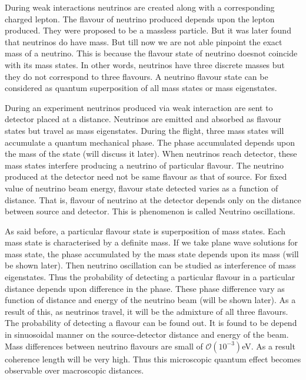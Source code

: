 \documentclass[12pt,a4paper]{report}
\begin{document}
During weak interactions neutrinos are created along with a corresponding charged lepton. The flavour of neutrino produced depends upon the lepton produced. They were proposed to be a massless particle.  But it was later found that neutrinos do have mass. But till now we are not able pinpoint the exact mass of a neutrino. This is because the flavour state of neutrino doesnot coincide with its mass states. In other words, neutrinos have three discrete masses but they do not correspond to three flavours. A neutrino flavour state can be considered as quantum superposition of all mass states or mass eigenstates. \par

During an experiment neutrinos produced via weak interaction are sent to detector placed at a distance. Neutrinos are emitted and absorbed as flavour states but travel as mass eigenstates. During the flight, three mass states will accumulate a quantum mechanical phase. The phase accumulated depends upon the mass of the state (will discuss it later). When neutrinos reach detector, these mass states interfere producing a neutrino of particular flavour. The neutrino produced at the detector need not be same flavour as that of source. For fixed value of neutrino beam energy, flavour state detected varies as a function of distance. That is, flavour of neutrino at the detector depends only on the distance between source and detector. This is phenomenon is called Neutrino oscillations.\par
As said before, a particular flavour state is superposition of mass states. Each mass state is characterised by a definite mass. If we take plane wave solutions for mass state, the phase accumulated by the mass state depends upon its mass (will be shown later). Then neutrino oscillation can be studied as interference of mass eigenstates. Thus the probability of detecting a particular flavour in a particular distance depends upon difference in the phase. These phase difference vary as function of distance and energy of the neutrino beam (will be shown later). As a result of this, as neutrinos travel, it will be the admixture of all three flavours. The probability of detecting a flavour can be found out. It is found to be depend in sinuosoidal manner on the source-detector distance and energy of the beam. Mass differences between neutrino flavours are small of $\mathcal{O}(10^{-3})$eV. As a result coherence length will be very high. Thus this microscopic quantum effect becomes observable over macroscopic distances.\par
\end{document}
